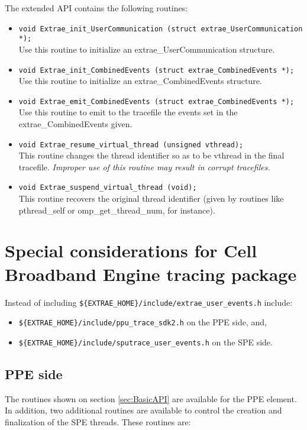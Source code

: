 The extended API contains the following routines:
\begin{itemize}
	\item {\tt void Extrae\_init\_UserCommunication (struct extrae\_UserCommunication *);}\\
	Use this routine to initialize an extrae\_UserCommunication structure.
	\item {\tt void Extrae\_init\_CombinedEvents (struct extrae\_CombinedEvents *);}\\
	Use this routine to initialize an extrae\_CombinedEvents structure.
	\item {\tt void Extrae\_emit\_CombinedEvents (struct extrae\_CombinedEvents *);}\\
	Use this routine to emit to the tracefile the events set in the extrae\_CombinedEvents given.
	\item {\tt void Extrae\_resume\_virtual\_thread (unsigned vthread);}\\
	This routine changes the thread identifier so as to be vthread in the final tracefile. {\em Improper use of this routine may result in corrupt tracefiles.}
	\item {\tt void Extrae\_suspend\_virtual\_thread (void);}\\
	This routine recovers the original thread identifier (given by routines like pthread\_self or omp\_get\_thread\_num, for instance).
\end{itemize}

\section{Special considerations for Cell Broadband Engine tracing package}

Instead of including {\tt \$\{EXTRAE\_HOME\}/include/extrae\_user\_events.h} include:
\begin{itemize}
 \item {\tt \$\{EXTRAE\_HOME\}/include/ppu\_trace\_sdk2.h} on the PPE side, and,
 \item {\tt \$\{EXTRAE\_HOME\}/include/sputrace\_user\_events.h} on the SPE side.
\end{itemize}

\subsection{PPE side}\label{subsec:PPEside}

The routines shown on section \ref{sec:BasicAPI} are available for the PPE element. In addition, two additional routines are available to control the creation and finalization of the SPE threads. These routines are:


